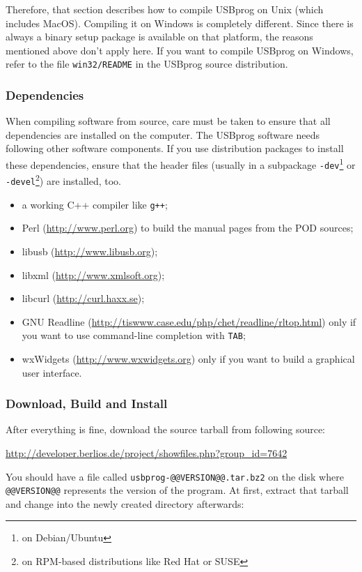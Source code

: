 \documentclass[bibtotoc,UKenglish,halfparskip,oneside,DIV12]{scrreprt}
\begin{document}
Therefore, that section describes how to compile USBprog on Unix (which includes MacOS).  Compiling
it on Windows is completely different. Since there is always a binary setup package is available on
that platform, the reasons mentioned above don't apply here. If you want to compile USBprog on
Windows, refer to the file \texttt{win32/README} in the USBprog source distribution.

\subsubsection{Dependencies}

When compiling software from source, care must be taken to ensure that all dependencies are
installed on the computer. The USBprog software needs following other software components. If you
use distribution packages to install these dependencies, ensure that the header files (usually in a
subpackage \texttt{-dev}\footnote{on Debian/Ubuntu} or \texttt{-devel}\footnote{on RPM-based
distributions like Red Hat or SUSE}) are installed, too.

\begin{itemize}
  \item a working C++ compiler like \texttt{g++};
  \item Perl (\url{http://www.perl.org}) to build the manual pages from the POD sources;
  \item libusb (\url{http://www.libusb.org});
  \item libxml (\url{http://www.xmlsoft.org});
  \item libcurl (\url{http://curl.haxx.se});
  \item GNU Readline (\url{http://tiswww.case.edu/php/chet/readline/rltop.html}) only if you want to
    use command-line completion with \texttt{TAB};
  \item wxWidgets (\url{http://www.wxwidgets.org}) only if you want to build a graphical user
    interface.
\end{itemize}

\subsubsection{Download, Build and Install}

After everything is fine, download the source tarball from following source:

 \url{http://developer.berlios.de/project/showfiles.php?group_id=7642}

You should have a file called \texttt{usbprog-@@VERSION@@.tar.bz2} on the disk where
\texttt{@@VERSION@@} represents the version of the program. At first, extract that tarball and
change into the newly created directory afterwards:
\end{document}
